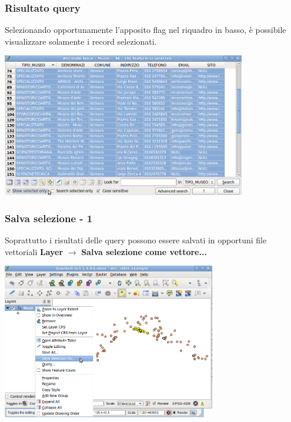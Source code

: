 \documentclass{beamer}
\begin{document}
{\begin{frame}
   \frametitle{Risultato query}
   Selezionando opportunamente l'apposito flag nel riquadro in basso, è possibile visualizzare solamente i record selezionati.
		    \begin{center}
			\includegraphics[width=0.80\textwidth] {topology_attrmanagement_pics/show_selected.png}
		    \end{center}
\end{frame}




 \begin{frame}
   \frametitle{Salva selezione - 1}
   Soprattutto i risultati delle query possono essere salvati in opportuni file vettoriali  \textbf{Layer} $\rightarrow$ \textbf{Salva selezione come vettore...}	
		    \begin{center}
			\includegraphics[width=0.70\textwidth] {topology_attrmanagement_pics/save_selection_as.png}
		    \end{center}
\end{frame}


}
\end{document}
